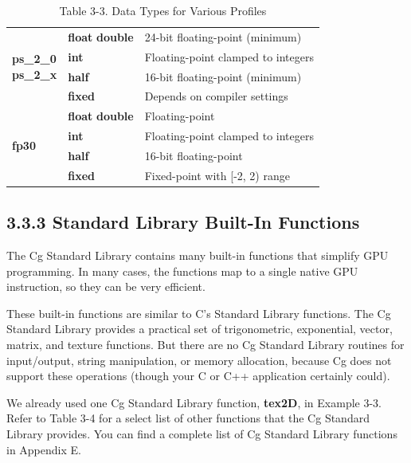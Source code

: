 \documentclass{book}
\begin{document}
\begin{table}
\begin{tabular}{ p{2cm} p{2cm} p{7cm}  }
\multirow{4}{4em}{\textbf{ps_2_0} \newline \textbf{ps_2_x}} & \textbf{float} \newline \textbf{double} & 24-bit floating-point (minimum)\\
\cline{2-3}
& \textbf{int} & Floating-point clamped to integers \\
\cline{2-3}
& \textbf{half} & 16-bit floating-point (minimum) \\
\cline{2-3}
& \textbf{fixed} & Depends on compiler settings\\
\hline

\multirow{4}{4em}{\textbf{fp30}} & \textbf{float} \newline \textbf{double} & Floating-point \\
\cline{2-3}
& \textbf{int} & Floating-point clamped to integers \\
\cline{2-3}
& \textbf{half} & 16-bit floating-point \\
\cline{2-3}
& \textbf{fixed} & Fixed-point with [-2, 2) range \\
\hline

\end{tabular}

\caption{Table 3-3. Data Types for Various Profiles}
\label{table:3-3}
\end{table}

\subsection{3.3.3 Standard Library Built-In Functions}

The Cg Standard Library contains many built-in functions that simplify GPU programming. In many cases, the functions map to a single native GPU instruction, so they can be very efficient.

These built-in functions are similar to C's Standard Library functions. The Cg Standard Library provides a practical set of trigonometric, exponential, vector, matrix, and texture functions. But there are no Cg Standard Library routines for input/output, string manipulation, or memory allocation, because Cg does not support these operations (though your C or C++ application certainly could).

We already used one Cg Standard Library function, \textbf{tex2D}, in Example 3-3. Refer to Table 3-4 for a select list of other functions that the Cg Standard Library provides. You can find a complete list of Cg Standard Library functions in Appendix E.
\end{document}
